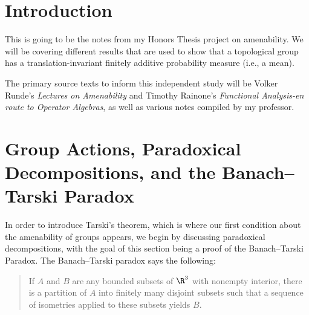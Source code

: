 \documentclass[12pt]{mypackage}
\begin{document}
\RaggedRight
\tableofcontents
\section{Introduction}%
This is going to be the notes from my Honors Thesis project on amenability. We will be covering different results that are used to show that a topological group has a translation-invariant finitely additive probability measure (i.e., a mean).\newline

The primary source texts to inform this independent study will be Volker Runde's \textit{Lectures on Amenability} and Timothy Rainone's \textit{Functional Analysis-en route to Operator Algebras}, as well as various notes compiled by my professor.
\section{Group Actions, Paradoxical Decompositions, and the Banach--Tarski Paradox}%
In order to introduce Tarski's theorem, which is where our first condition about the amenability of groups appears, we begin by discussing paradoxical decompositions, with the goal of this section being a proof of the Banach--Tarski Paradox. The Banach--Tarski paradox says the following:
\begin{quote}
  If $A$ and $B$ are any bounded subsets of $\R^{3}$ with nonempty interior, there is a partition of $A$ into finitely many disjoint subsets such that a sequence of isometries applied to these subsets yields $B$.
\end{quote}
\end{document}
